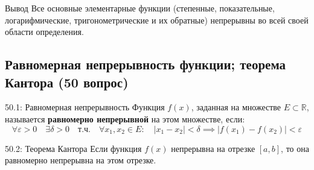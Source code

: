\documentclass[a4paper,12pt]{article}
\begin{document}
	
	\begin{center}
	\end{center}
	
	\vspace{0.5cm}
	\begin{importantbox}{Вывод}
		Все основные элементарные функции (степенные, показательные, логарифмические, тригонометрические и их обратные) непрерывны во всей своей области определения.
	\end{importantbox}
	
	
	
	
	
	
	
	\newpage
	\subsection{Равномерная непрерывность функции; теорема Кантора (50 вопрос)}
	
	\begin{definitionbox}{50.1: Равномерная непрерывность}
		Функция $f(x)$, заданная на множестве $E \subset \mathbb{R}$, называется \textbf{равномерно непрерывной} на этом множестве, если:
		$$ \forall \varepsilon > 0 \quad \exists \delta > 0 \quad \text{т.ч.} \quad \forall x_1, x_2 \in E: \quad |x_1 - x_2| < \delta \implies |f(x_1) - f(x_2)| < \varepsilon $$
	\end{definitionbox}
	
	\begin{theorembox}{50.2: Теорема Кантора}
		Если функция $f(x)$ непрерывна на отрезке $[a, b]$, то она равномерно непрерывна на этом отрезке.
	\end{theorembox}
	
\end{document}
